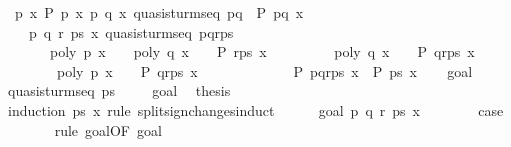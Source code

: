 \begin{isabellebody}
\ \ {\isachardoublequoteopen}{\isasymlbrakk}{\isasymAnd}p\ x{\isachardot}\ P\ {\isacharbrackleft}p{\isacharbrackright}\ x{\isacharsemicolon}\ {\isasymAnd}p\ q\ x{\isachardot}\ quasi{\isacharunderscore}sturm{\isacharunderscore}seq\ {\isacharbrackleft}p{\isacharcomma}q{\isacharbrackright}\ {\isasymLongrightarrow}\ P\ {\isacharbrackleft}p{\isacharcomma}q{\isacharbrackright}\ x{\isacharsemicolon}\isanewline
\ \ \ \ {\isasymAnd}p\ q\ r\ ps\ x{\isachardot}\ quasi{\isacharunderscore}sturm{\isacharunderscore}seq\ {\isacharparenleft}p{\isacharhash}q{\isacharhash}r{\isacharhash}ps{\isacharparenright}\ {\isasymLongrightarrow}\isanewline
\ \ \ \ \ \ \ {\isasymlbrakk}poly\ p\ x\ {\isasymnoteq}\ {}\ {\isasymLongrightarrow}\ poly\ q\ x\ {\isacharequal}\ {}\ {\isasymLongrightarrow}\ P\ {\isacharparenleft}r{\isacharhash}ps{\isacharparenright}\ x{\isacharsemicolon}\ \isanewline
\ \ \ \ \ \ \ \ poly\ q\ x\ {\isasymnoteq}\ {}\ {\isasymLongrightarrow}\ P\ {\isacharparenleft}q{\isacharhash}r{\isacharhash}ps{\isacharparenright}\ x{\isacharsemicolon}\isanewline
\ \ \ \ \ \ \ \ poly\ p\ x\ {\isacharequal}\ {}\ {\isasymLongrightarrow}\ P\ {\isacharparenleft}q{\isacharhash}r{\isacharhash}ps{\isacharparenright}\ x{\isasymrbrakk}\ \isanewline
\ \ \ \ \ \ \ \ \ \ \ {\isasymLongrightarrow}\ P\ {\isacharparenleft}p{\isacharhash}q{\isacharhash}r{\isacharhash}ps{\isacharparenright}\ x{\isasymrbrakk}\ {\isasymLongrightarrow}\ P\ ps\ x{\isachardoublequoteclose}\isanewline
%
\isadelimproof
%
\endisadelimproof
%
\isatagproof
{}\isamarkupfalse%
{\isacharminus}\isanewline
\ \ \isamarkupfalse%
\ goal{}\isanewline
\ \ \isamarkupfalse%
\ {\isachardoublequoteopen}quasi{\isacharunderscore}sturm{\isacharunderscore}seq\ ps{\isachardoublequoteclose}\ \isacommand{{\isachardot}{\isachardot}}\isamarkupfalse%
\isanewline
\ \ \isamarkupfalse%
\ goal{}\ \isamarkupfalse%
\ {\isacharquery}thesis\isanewline
\ \ \isamarkupfalse%
\ {\isacharparenleft}induction\ ps\ x\ rule{\isacharcolon}\ split{\isacharunderscore}sign{\isacharunderscore}changes{\isachardot}induct{\isacharparenright}\isanewline
\ \ \ \ \isamarkupfalse%
\ {\isacharparenleft}goal{}\ p\ q\ r\ ps\ x{\isacharparenright}\isanewline
\ \ \ \ \ \ \isamarkupfalse%
\ {\isacharquery}case\isanewline
\ \ \ \ \ \ \isamarkupfalse%
\ {\isacharparenleft}rule\ goal{}{\isacharparenleft}{}{\isacharparenright}{\isacharbrackleft}OF\ goal{}{\isacharparenleft}{}{\isacharparenright}{\isacharbrackright}{\isacharparenright}\isanewline

\end{isabellebody}
